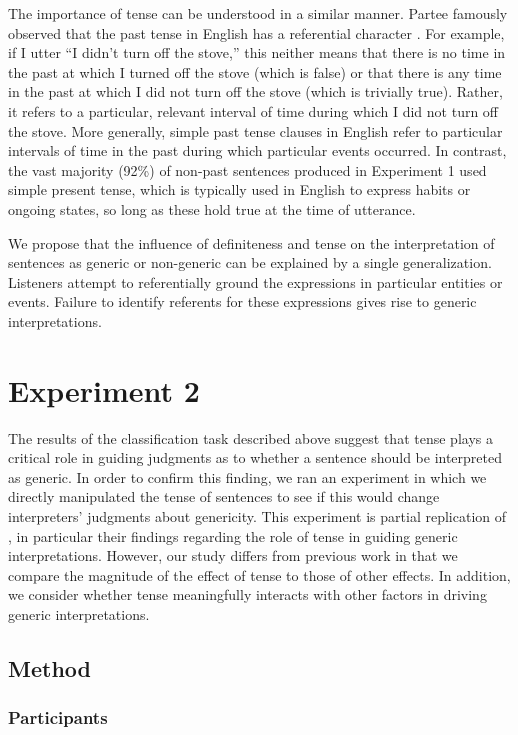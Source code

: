 \documentclass[10pt,letterpaper]{article}
\begin{document}
The importance of tense can be understood in a similar manner. Partee famously observed that the past tense in English has a referential character \cite{Partee:1973}. For example, if I utter ``I didn't turn off the stove,'' this neither means that there is no time in the past at which I turned off the stove (which is false) or that there is any time in the past at which I did not turn off the stove (which is trivially true). Rather, it refers to a particular, relevant interval of time during which I did not turn off the stove. More generally, simple past tense clauses in English refer to particular intervals of time in the past during which particular events occurred. In contrast, the vast majority (92\%) of non-past sentences produced in Experiment 1 used simple present tense, which is typically used in English to express habits or ongoing states, so long as these hold true at the time of utterance.

We propose that the influence of definiteness and tense on the interpretation of sentences as generic or non-generic can be explained by a single generalization. Listeners attempt to referentially ground the expressions in particular entities or events. Failure to identify referents for these expressions gives rise to generic interpretations.

\section{Experiment 2}

The results of the classification task described above suggest that tense plays a critical role in guiding judgments as to whether a sentence should be interpreted as generic. In order to confirm this finding, we ran an experiment in which we directly manipulated the tense of sentences to see if this would change interpreters' judgments about genericity. This experiment is partial replication of , in particular their findings regarding the role of tense in guiding generic interpretations. However, our study differs from previous work in that we compare the magnitude of the effect of tense to those of other effects. In addition, we consider whether tense meaningfully interacts with other factors in driving generic interpretations.

\subsection{Method}

\subsubsection{Participants}
\end{document}
